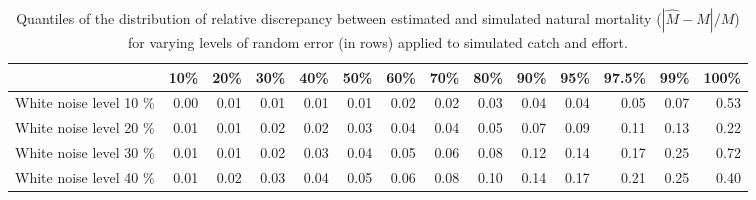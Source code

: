 \begin{sidewaystable}[ht]
\centering
\begin{tabular}{rrrrrrrrrrrrrr}
  \hline
 & 10\% & 20\% & 30\% & 40\% & 50\% & 60\% & 70\% & 80\% & 90\% & 95\% & 97.5\% & 99\% & 100\% \\ 
  \hline
White noise level  10 \% & 0.00 & 0.01 & 0.01 & 0.01 & 0.01 & 0.02 & 0.02 & 0.03 & 0.04 & 0.04 & 0.05 & 0.07 & 0.53 \\ 
  White noise level  20 \% & 0.01 & 0.01 & 0.02 & 0.02 & 0.03 & 0.04 & 0.04 & 0.05 & 0.07 & 0.09 & 0.11 & 0.13 & 0.22 \\ 
  White noise level  30 \% & 0.01 & 0.01 & 0.02 & 0.03 & 0.04 & 0.05 & 0.06 & 0.08 & 0.12 & 0.14 & 0.17 & 0.25 & 0.72 \\ 
  White noise level  40 \% & 0.01 & 0.02 & 0.03 & 0.04 & 0.05 & 0.06 & 0.08 & 0.10 & 0.14 & 0.17 & 0.21 & 0.25 & 0.40 \\ 
   \hline
\end{tabular}
\caption{Quantiles of the distribution of relative discrepancy between estimated and simulated natural mortality ($|\hat{M} - M|/M$) for varying levels of random error (in rows) applied to simulated catch and effort.} 
\label{tab:SummaryOfDistributionOfNaturalMortality2}
\end{sidewaystable}
